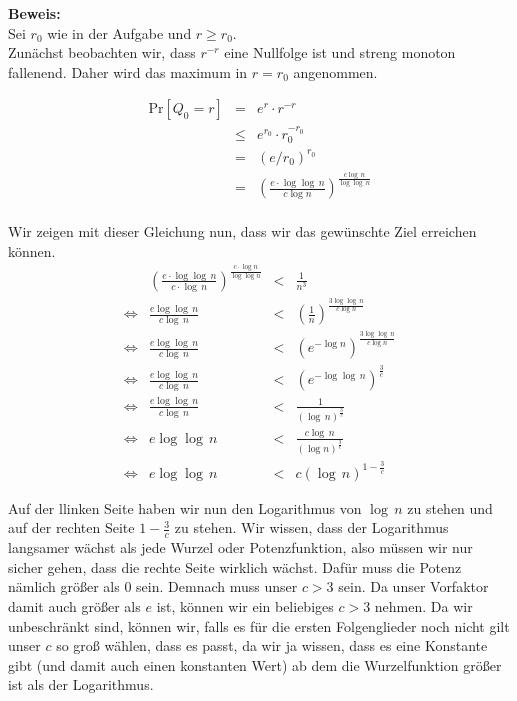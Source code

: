 \documentclass[11pt,a4paper,ngerman]{article}
\newcommand{\prob}[1]{\text{Pr}\left[ #1 \right]}
\begin{document}
\noindent\textbf{Beweis:}\\

Sei $r_0$ wie in der Aufgabe und $r \geq r_0$.\\

Zunächst beobachten wir, dass $r^{-r}$ eine Nullfolge ist und streng monoton fallenend. Daher wird das maximum in $r = r_0$ angenommen.

$$\begin{array}{rcl}
	\prob{Q_0 = r} &=& e^r \cdot r^{-r}\\
			&\leq& e^{r_0} \cdot r_0^{-r_0}\\
			&=& (e / r_0)^{r_0}\\
			&=& \left(\frac{e \cdot \log \log \, n}{c \log n}\right)^\frac{c \log \, n}{\log \log \, n}\\
\end{array}$$

Wir zeigen mit dieser Gleichung nun, dass wir das gewünschte Ziel erreichen können.
$$\begin{array}{crcl}
	&\left(\frac{e\cdot \log \log \, n}{c \cdot \log \, n}\right)^\frac{c \cdot \log n}{\log \log n} &<& \frac{1}{n^3}\\
\Leftrightarrow & \frac{e\log \log \, n}{c\log \, n} &<& \left(\frac{1}{n}\right)^\frac{3\log \log \, n}{c\log n}\\
\Leftrightarrow & \frac{e\log \log \, n}{c\log \, n} &<& \left(e^{- \log n} \right)^\frac{3\log \log \, n}{c\log n}\\
\Leftrightarrow & \frac{e\log \log \, n }{c\log \, n} &<& \left(e^{- \log \log \, n}\right)^\frac{3}{c}\\
\Leftrightarrow & \frac{e\log \log \, n}{c\log \, n} &<& \frac{1}{\left(\log \, n\right)^\frac{3}{c}}\\
\Leftrightarrow & e \log \log \, n &<& \frac{c \log \, n}{(\log n)^\frac{3}{c}}\\
\Leftrightarrow & e \log \log \, n &<& c (\log \, n)^{1 - \frac{3}{c}}
\end{array}$$

Auf der llinken Seite haben wir nun den Logarithmus von $\log \, n$ zu stehen und auf der rechten Seite $1-\frac{3}{c}$ zu stehen. Wir wissen, dass der Logarithmus langsamer wächst als jede Wurzel oder Potenzfunktion, also müssen wir nur sicher gehen, dass die rechte Seite wirklich wächst. Dafür muss die Potenz nämlich größer als $0$ sein. Demnach muss unser $c>3$ sein. Da unser Vorfaktor damit auch größer als $e$ ist, können wir ein beliebiges $c > 3$ nehmen. Da wir unbeschränkt sind, können wir, falls es für die ersten Folgenglieder noch nicht gilt unser $c$ so groß wählen, dass es passt, da wir ja wissen, dass es eine Konstante gibt (und damit auch einen konstanten Wert) ab dem die Wurzelfunktion größer ist als der Logarithmus.
\end{document}
